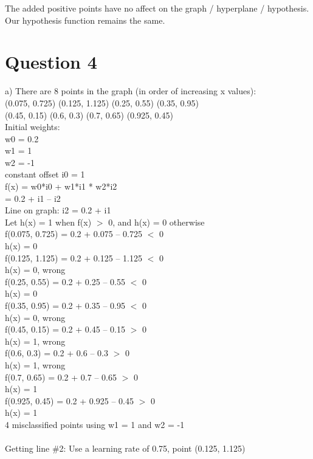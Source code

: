 \documentclass{article}
\begin{document}
The added positive points have no affect on the graph / hyperplane / hypothesis. Our hypothesis function remains the same. 
\section{Question 4}

a)	There are 8 points in the graph (in order of increasing x values):
\\
(0.075, 0.725)	(0.125, 1.125)		(0.25, 0.55)	(0.35, 0.95)
\\
(0.45, 0.15)		(0.6, 0.3)		(0.7, 0.65)	(0.925, 0.45)
\\
Initial weights: 
\\
w0 = 0.2
\\
w1 = 1
\\
w2 = -1
\\
constant offset i0 = 1
\\
f(x) = w0*i0 + w1*i1 * w2*i2
\\
	= 0.2 + i1 – i2
\\
Line on graph: i2 = 0.2 + i1
\\
Let h(x) = 1 when f(x) $>$ 0, and h(x) = 0 otherwise
\\
f(0.075, 0.725) = 0.2 + 0.075 – 0.725 $<$ 0		
\\
h(x) = 0
\\
f(0.125, 1.125) = 0.2 + 0.125 – 1.125 $<$ 0		
\\
h(x) = 0, wrong
\\
f(0.25, 0.55) = 0.2 + 0.25 – 0.55 $<$ 0	
\\	
h(x) = 0
\\
f(0.35, 0.95) = 0.2 + 0.35 – 0.95 $<$ 0	
\\
h(x) = 0, wrong
\\
f(0.45, 0.15) = 0.2 + 0.45 – 0.15 $>$ 0
\\		
h(x) = 1, wrong
\\
f(0.6, 0.3) = 0.2 + 0.6 – 0.3 $>$ 0	
\\		
h(x) = 1, wrong
\\
f(0.7, 0.65) = 0.2 + 0.7 – 0.65 $>$ 0		
\\	
h(x) = 1
\\
f(0.925, 0.45) = 0.2 + 0.925 – 0.45 $>$ 0	
\\	
h(x) = 1
\\
4 misclassified points using w1 = 1 and w2 = -1
\\
\\
{\LARGE Getting line \#2:}
Use a learning rate of 0.75, point (0.125, 1.125)
\\
\end{document}
